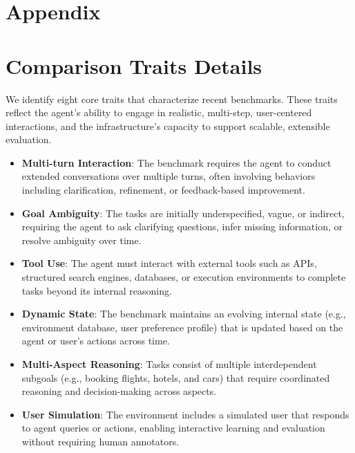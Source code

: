 \clearpage
\appendix

\section*{Appendix}
\label{sec:appendix}

\section{Comparison Traits Details}
\label{sec:apdx_comparison}

We identify eight core traits that characterize recent benchmarks. These traits reflect the agent’s ability to engage in realistic, multi-step, user-centered interactions, and the infrastructure's capacity to support scalable, extensible evaluation.

\begin{itemize}[topsep=2pt, partopsep=-3pt, leftmargin=8pt, itemsep=-3pt]
  \item \textbf{Multi-turn Interaction}: The benchmark requires the agent to conduct extended conversations over multiple turns, often involving behaviors including clarification, refinement, or feedback-based improvement.
  
  \item \textbf{Goal Ambiguity}: The tasks are initially underspecified, vague, or indirect, requiring the agent to ask clarifying questions, infer missing information, or resolve ambiguity over time.
  
  \item \textbf{Tool Use}: The agent must interact with external tools such as APIs, structured search engines, databases, or execution environments to complete tasks beyond its internal reasoning.
  
  \item \textbf{Dynamic State}: The benchmark maintains an evolving internal state (e.g., environment database, user preference profile) that is updated based on the agent or user's actions across time.
  
  \item \textbf{Multi-Aspect Reasoning}: Tasks consist of multiple interdependent subgoals (e.g., booking flights, hotels, and cars) that require coordinated reasoning and decision-making across aspects.
  
  \item \textbf{User Simulation}: The environment includes a simulated user that responds to agent queries or actions, enabling interactive learning and evaluation without requiring human annotators.
  

\end{itemize}
